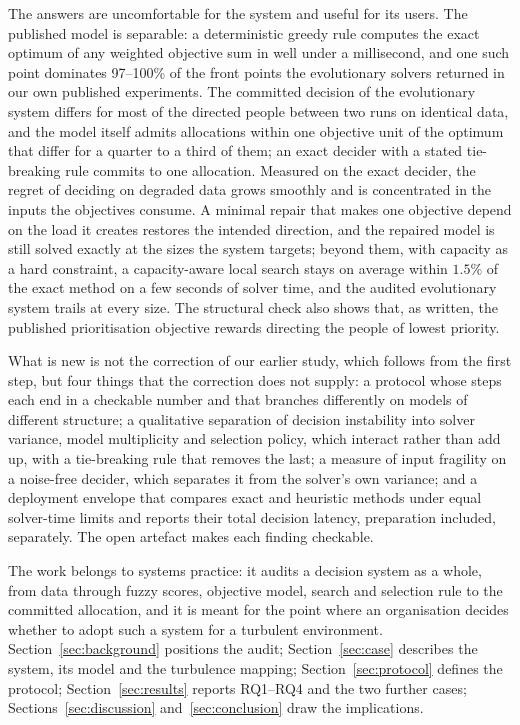 \documentclass[systems,article,accept,moreauthors,pdftex]{Definitions/mdpi}
\begin{document}
The answers are uncomfortable for the system and useful for its users. The published model
is separable: a deterministic greedy rule computes the exact optimum of any weighted
objective sum in well under a millisecond, and one such point dominates 97--100\% of the front points the
evolutionary solvers returned in our own published experiments. The committed decision of the
evolutionary system differs for most of the directed people between two runs on identical
data, and the model itself admits allocations within one objective unit of the optimum that
differ for a quarter to a third of them; an exact decider with a stated tie-breaking rule
commits to one allocation. Measured on the exact decider, the regret of deciding on degraded
data grows smoothly and is concentrated in the inputs the objectives consume. A minimal repair
that makes one objective depend on the load it creates restores the intended direction, and
the repaired model is still solved exactly at the sizes the system targets; beyond them, with
capacity as a hard constraint, a capacity-aware local search stays on average within $1.5\%$ of
the exact method on a few seconds of solver time, and the audited evolutionary system trails at every size. The structural check also shows that, as written, the published
prioritisation objective rewards directing the people of lowest priority.

What is new is not the correction of our earlier study, which follows from the first step, but
four things that the correction does not supply: a protocol whose steps each end in a
checkable number and that branches differently on models of different structure; a
qualitative separation of decision instability into solver variance, model multiplicity and
selection policy, which interact rather than add up, with a tie-breaking rule that removes the
last; a measure of input fragility on a
noise-free decider, which separates it from the solver's own variance; and a deployment
envelope that compares exact and heuristic methods under equal solver-time limits and reports
their total decision latency, preparation included, separately. The open
artefact makes each finding checkable.

The work belongs to systems practice: it audits a decision system as a whole, from data
through fuzzy scores, objective model, search and selection rule to the committed allocation,
and it is meant for the point where an organisation decides whether to adopt such a system
for a turbulent environment. Section~\ref{sec:background} positions the audit;
Section~\ref{sec:case} describes the system, its model and the turbulence mapping;
Section~\ref{sec:protocol} defines the protocol; Section~\ref{sec:results} reports RQ1--RQ4
and the two further cases; Sections~\ref{sec:discussion} and~\ref{sec:conclusion} draw the
implications.
\end{document}
